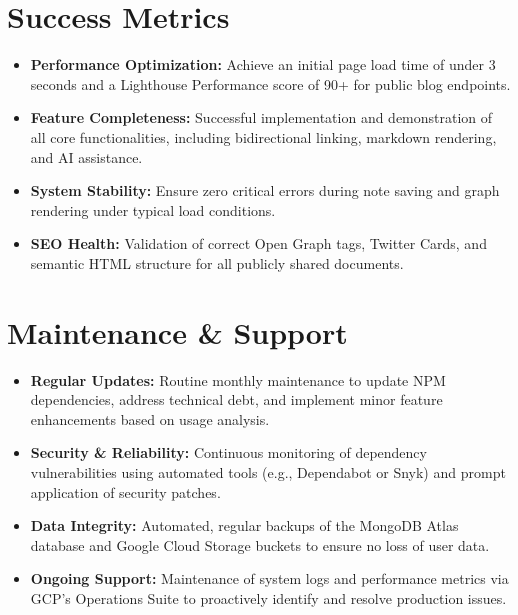 \documentclass[12pt, a4paper]{article}
\begin{document}
\section{Success Metrics}

\begin{itemize}[leftmargin=2em]
    \item \textbf{Performance Optimization:} Achieve an initial page load time of under 3 seconds and a Lighthouse Performance score of 90+ for public blog endpoints.
    \item \textbf{Feature Completeness:} Successful implementation and demonstration of all core functionalities, including bidirectional linking, markdown rendering, and AI assistance.
    \item \textbf{System Stability:} Ensure zero critical errors during note saving and graph rendering under typical load conditions.
    \item \textbf{SEO Health:} Validation of correct Open Graph tags, Twitter Cards, and semantic HTML structure for all publicly shared documents.
\end{itemize}

\section{Maintenance \& Support}

\begin{itemize}[leftmargin=2em]
    \item \textbf{Regular Updates:} Routine monthly maintenance to update NPM dependencies, address technical debt, and implement minor feature enhancements based on usage analysis.
    \item \textbf{Security \& Reliability:} Continuous monitoring of dependency vulnerabilities using automated tools (e.g., Dependabot or Snyk) and prompt application of security patches.
    \item \textbf{Data Integrity:} Automated, regular backups of the MongoDB Atlas database and Google Cloud Storage buckets to ensure no loss of user data.
    \item \textbf{Ongoing Support:} Maintenance of system logs and performance metrics via GCP's Operations Suite to proactively identify and resolve production issues.
\end{itemize}
\end{document}
